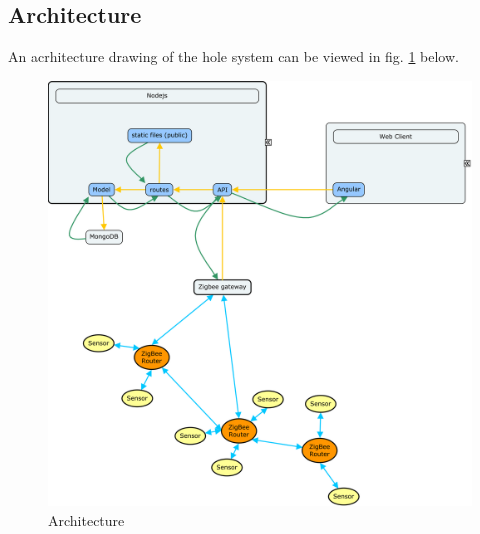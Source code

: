 \documentclass[a4paper,12pt,english]{article}
\begin{document}
\subsection{Architecture}
An acrhitecture drawing of the hole system can be viewed in fig. \ref{uml}
below. 

\begin{figure}[h]
\includegraphics[scale=0.15]{img/architecture.png}
\caption{Architecture}
\label{uml}
\end{figure}
\end{document}
